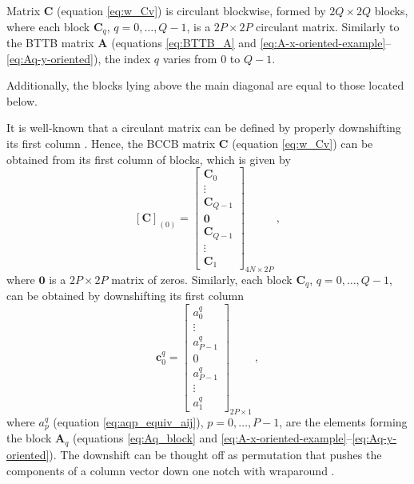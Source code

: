 Matrix $\mathbf{C}$ (equation \ref{eq:w_Cv})
is circulant blockwise, formed by $2Q \times 2Q$ blocks, where
each block $\mathbf{C}_{q}$, $q = 0, \dots, Q-1$, is a $2P \times 2P$ circulant matrix. 
Similarly to the BTTB matrix $\mathbf{A}$ (equations \ref{eq:BTTB_A} and 
\ref{eq:A-x-oriented-example}--\ref{eq:Aq-y-oriented}), the index $q$ 
varies from $0$ to $Q - 1$. 

Additionally, the blocks lying 
above the main diagonal are equal to those located below.

It is well-known that a circulant matrix can be defined by properly downshifting 
its first column \citep[][ p. 206]{vanloan1992}. Hence, the BCCB matrix $\mathbf{C}$ 
(equation \ref{eq:w_Cv}) can be obtained from its 
first column of blocks, which is given by
\begin{equation}
\left[\mathbf{C} \right]_{(0)} = 
	\begin{bmatrix}
	\mathbf{C}_{0} \\
	\vdots \\
	\mathbf{C}_{Q-1} \\
	\mathbf{0} \\
	\mathbf{C}_{Q-1} \\
	\vdots \\
	\mathbf{C}_{1}
	\end{bmatrix}_{4N \times 2P} \: ,
	\label{eq:C-first-column-blocks}
\end{equation}
where $\mathbf{0}$ is a $2P \times 2P$ matrix of zeros. Similarly, each block 
$\mathbf{C}_{q}$, $q = 0, \dots, Q-1$, can be obtained by downshifting its first 
column
\begin{equation}
\mathbf{c}^{q}_{0} = 
	\begin{bmatrix}
		a^{q}_{0} \\
		\vdots \\
		a^{q}_{P-1} \\
		0 \\
		a^{q}_{P-1} \\
		\vdots \\
		a^{q}_{1}
	\end{bmatrix}_{2P \times 1} \: ,
	\label{eq:Cq-first-column}
\end{equation}
where $a^{q}_{p}$ (equation \ref{eq:aqp_equiv_aij}), $p = 0, \dots, P-1$, are the elements 
forming the block $\mathbf{A}_{q}$ (equations \ref{eq:Aq_block} and 
\ref{eq:A-x-oriented-example}--\ref{eq:Aq-y-oriented}).
The downshift can be thought off as permutation that pushes the components of a column vector 
down one notch with wraparound \citep[][ p. 20]{golub-vanloan2013}.
